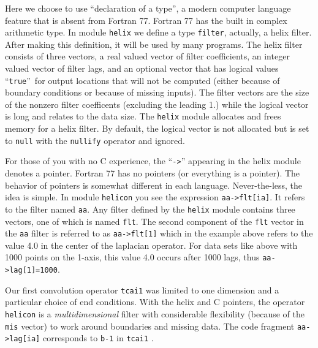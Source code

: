 \par
Here we choose to use
``declaration of a type'',
a modern computer language feature that is absent from Fortran 77.
Fortran 77 has the built in complex arithmetic type.
In module \texttt{helix}
we define a type \texttt{filter}, actually, a helix filter.
After making this definition, it will be used by many programs.
The helix filter consists of three vectors,
a real valued vector of filter coefficients,
an integer valued vector of filter lags,
and an optional vector
that has logical values ``\texttt{true}''~for
output locations that will not be computed
(either because of boundary conditions or because of missing inputs).
The filter vectors are the size of the nonzero filter coefficents
(excluding the leading 1.) while the logical vector is long
and relates to the data size.
The \texttt{helix} module allocates and frees memory for a helix filter.
By default, the logical vector is not allocated but
is set to \texttt{null}
with the \texttt{nullify} operator and ignored.
\par
For those of you with no C  experience,
the ``\verb#->#'' appearing in the helix module denotes a pointer.
Fortran 77 has no pointers (or everything is a pointer).
The behavior of pointers is somewhat different in each language.
Never-the-less, the idea is simple.
In module \texttt{helicon} 
you see the expression
\verb#aa->flt[ia]#.
It refers to the filter named \texttt{aa}.
Any filter defined by the \texttt{helix} module
contains three vectors, one of which is named \texttt{flt}.
The second component of the \texttt{flt} vector
in the \texttt{aa} filter
is referred to as
\verb#aa->flt[1]# which
in the example above refers to the value 4.0
in the center of the laplacian operator.
For data sets like above with 1000 points on the 1-axis,
this value 4.0 occurs after 1000 lags,
thus \verb#aa->lag[1]=1000#.

\par
Our first convolution operator
\texttt{tcai1}
was limited to one dimension and a particular choice of end conditions.
With the helix and C pointers,
the operator
\texttt{helicon} 
is a {\it multidimensional} filter
with considerable flexibility (because of the \texttt{mis} vector)
to work around boundaries and missing data.
The code fragment
\verb#aa->lag[ia]#
corresponds to 
\texttt{b-1}
in \texttt{tcai1} .


